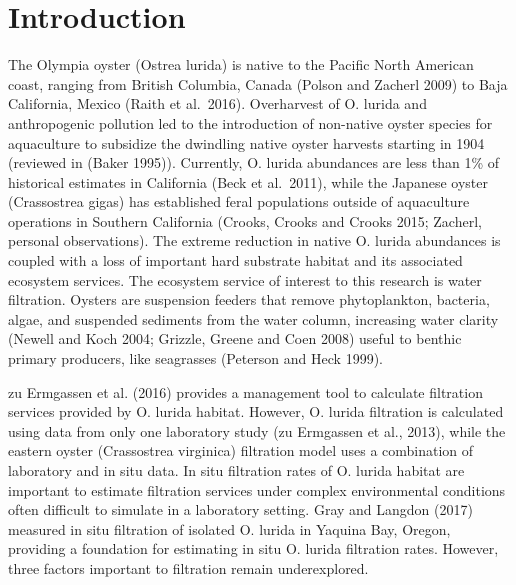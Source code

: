\documentclass[]{article}
\title{}
\author{}
\date{}
\begin{document}
\hypertarget{introduction}{%
\section{Introduction}\label{introduction}}

The Olympia oyster (Ostrea lurida) is native to the Pacific North
American coast, ranging from British Columbia, Canada (Polson and
Zacherl 2009) to Baja California, Mexico (Raith et al.~2016).
Overharvest of O. lurida and anthropogenic pollution led to the
introduction of non-native oyster species for aquaculture to subsidize
the dwindling native oyster harvests starting in 1904 (reviewed in
(Baker 1995)). Currently, O. lurida abundances are less than 1\% of
historical estimates in California (Beck et al.~2011), while the
Japanese oyster (Crassostrea gigas) has established feral populations
outside of aquaculture operations in Southern California (Crooks, Crooks
and Crooks 2015; Zacherl, personal observations). The extreme reduction
in native O. lurida abundances is coupled with a loss of important hard
substrate habitat and its associated ecosystem services. The ecosystem
service of interest to this research is water filtration. Oysters are
suspension feeders that remove phytoplankton, bacteria, algae, and
suspended sediments from the water column, increasing water clarity
(Newell and Koch 2004; Grizzle, Greene and Coen 2008) useful to benthic
primary producers, like seagrasses (Peterson and Heck 1999).

zu Ermgassen et al. (2016) provides a management tool to calculate
filtration services provided by O. lurida habitat. However, O. lurida
filtration is calculated using data from only one laboratory study (zu
Ermgassen et al., 2013), while the eastern oyster (Crassostrea
virginica) filtration model uses a combination of laboratory and in situ
data. In situ filtration rates of O. lurida habitat are important to
estimate filtration services under complex environmental conditions
often difficult to simulate in a laboratory setting. Gray and Langdon
(2017) measured in situ filtration of isolated O. lurida in Yaquina Bay,
Oregon, providing a foundation for estimating in situ O. lurida
filtration rates. However, three factors important to filtration remain
underexplored.
\end{document}
